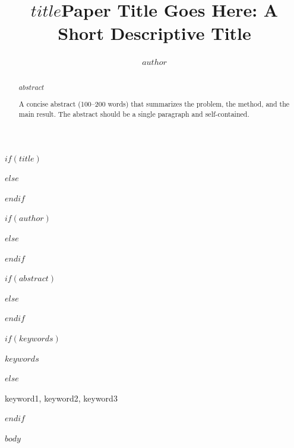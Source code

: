 \documentclass[conference]{IEEEtran}
\begin{document}
$if(title)$
\title{$title$}
$else$
\title{Paper Title Goes Here: A Short Descriptive Title}
$endif$

$if(author)$
\author{$author$}
$else$
\author{
  \and
}
$endif$

\maketitle

$if(abstract)$
\begin{abstract}
$abstract$
\end{abstract}
$else$
\begin{abstract}
A concise abstract (100--200 words) that summarizes the problem, the method, and the main result. The abstract should be a single paragraph and self-contained.
\end{abstract}
$endif$

$if(keywords)$
\begin{IEEEkeywords}
$keywords$
\end{IEEEkeywords}
$else$
\begin{IEEEkeywords}
keyword1, keyword2, keyword3
\end{IEEEkeywords}
$endif$

$body$
\end{document}

